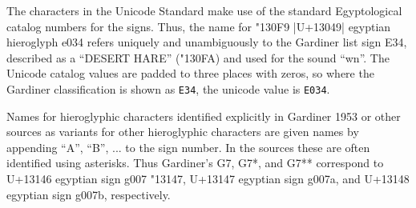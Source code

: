 The characters in the Unicode Standard make use of the standard Egyptological catalog
numbers for the signs. Thus, the name for {\hiero\char"130F9} |U+13049| egyptian hieroglyph e034 refers
uniquely and unambiguously to the Gardiner list sign E34, described as a “{\aegean DESERT HARE}” ({\hiero \char"130FA}) and used for the sound “wn”. The Unicode catalog values are padded to three places with
zeros, so where the Gardiner classification is shown as \texttt{E34}, the unicode value is \texttt{E034}. 

Names for hieroglyphic characters identified explicitly in Gardiner 1953 or other sources as
variants for other hieroglyphic characters are given names by appending “A”, “B”, ... to the sign number. In the sources these are often identified using asterisks. Thus Gardiner’s G7,
G7*, and G7** correspond to U+13146 egyptian sign g007 {\hiero \char"13147}, U+13147 egyptian sign g007a, and U+13148 egyptian sign g007b, respectively.

\def\texthiero#1{{\color{black!95}\hiero #1}}

